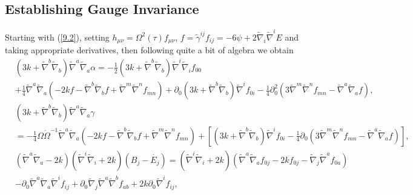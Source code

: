 \documentclass[aps,onecolumn,10pt]{revtex4}
\numberwithin{equation}{section}
\numberwithin{equation}{section}
\begin{document}
\subsection{Establishing Gauge Invariance}

Starting with (\ref{9.2}), setting $h_{\mu\nu}=\Omega^2(\tau)f_{\mu\nu}$,  $f=\tilde{\gamma}^{ij}f_{ij}=-6\psi+2\tilde{\nabla}_i\tilde{\nabla}^iE$ and taking appropriate derivatives, then following quite a bit of algebra we obtain
%
\begin{align}
&(3k+\tilde{\nabla}^b\tilde{\nabla}_b)\tilde{\nabla}^a\tilde{\nabla}_a\alpha=-\frac{1}{2}(3k+\tilde{\nabla}^b\tilde{\nabla}_b)\tilde{\nabla}^i\tilde{\nabla}_if_{00}
\nonumber\\
&+\frac{1}{4}\tilde{\nabla}^a\tilde{\nabla}_a\left(-2kf-\tilde{\nabla}^b\tilde{\nabla}_bf+\tilde{\nabla}^m\tilde{\nabla}^nf_{mn}\right)
+\partial_0(3k+\tilde{\nabla}^b\tilde{\nabla}_b)\tilde{\nabla}^if_{0i}-\frac{1}{4}\partial^2_0\left(3\tilde{\nabla}^m\tilde{\nabla}^nf_{mn}-\tilde{\nabla}^a\tilde{\nabla}_af\right),
\label{9.43a}
\end{align}
%
%
\begin{align}
&(3k+\tilde{\nabla}^b\tilde{\nabla}_b)\tilde{\nabla}^a\tilde{\nabla}_a\gamma
\nonumber\\
&=-\frac{1}{4}\Omega\dot{\Omega}^{-1}\tilde{\nabla}^a\tilde{\nabla}_a\left(-2kf-\tilde{\nabla}^b\tilde{\nabla}_bf+\tilde{\nabla}^m\tilde{\nabla}^nf_{mn}\right)
+\left[(3k+\tilde{\nabla}^b\tilde{\nabla}_b)\tilde{\nabla}^if_{0i}-\frac{1}{4}\partial_0\left(3\tilde{\nabla}^m\tilde{\nabla}^nf_{mn}-\tilde{\nabla}^a\tilde{\nabla}_af\right)\right],
\label{9.44a}
\end{align}
%
%
\begin{align}
&(\tilde{\nabla}^a\tilde{\nabla}_a-2k)(\tilde{\nabla}^i\tilde{\nabla}_i +2k)(B_j-\dot{E_j})=(\tilde{\nabla}^i\tilde{\nabla}_i +2k)(\tilde{\nabla}^a\tilde{\nabla}_af_{0j}-2kf_{0j}
-\tilde{\nabla}_j\tilde{\nabla}^af_{0a})
\nonumber
\\
&-\partial_0\tilde{\nabla}^a\tilde{\nabla}_a\tilde{\nabla}^if_{ij}
+\partial_0\tilde{\nabla}_j\tilde{\nabla}^a\tilde{\nabla}^bf_{ab}
+2k\partial_0\tilde{\nabla}^if_{ij},
\label{9.45a}
\end{align}
%
\end{document}
